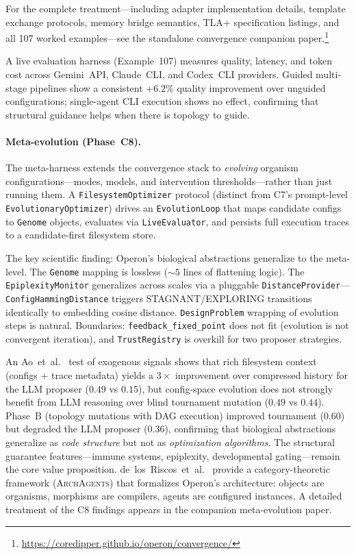 For the complete treatment---including adapter implementation details, template
exchange protocols, memory bridge semantics, TLA+ specification listings, and all
107 worked examples---see the standalone convergence companion
paper.\footnote{\url{https://coredipper.github.io/operon/convergence/}}

A live evaluation harness (Example~107) measures quality, latency, and token
cost across Gemini~API, Claude~CLI, and Codex~CLI providers. Guided
multi-stage pipelines show a consistent $+6.2\%$ quality improvement over
unguided configurations; single-agent CLI execution shows no effect,
confirming that structural guidance helps when there is topology to guide.

\paragraph{Meta-evolution (Phase~C8).}
The meta-harness extends the convergence stack to \emph{evolving} organism
configurations---modes, models, and intervention thresholds---rather than
just running them. A \texttt{FilesystemOptimizer} protocol (distinct from
C7's prompt-level \texttt{EvolutionaryOptimizer}) drives an
\texttt{EvolutionLoop} that maps candidate configs to \texttt{Genome}
objects, evaluates via \texttt{LiveEvaluator}, and persists full execution
traces to a candidate-first filesystem store.

The key scientific finding: Operon's biological abstractions generalize to
the meta-level. The \texttt{Genome} mapping is lossless (${\sim}5$ lines of
flattening logic). The \texttt{EpiplexityMonitor} generalizes across scales
via a pluggable \texttt{DistanceProvider}---\texttt{ConfigHammingDistance}
triggers STAGNANT/EXPLORING transitions identically to embedding cosine
distance. \texttt{DesignProblem} wrapping of evolution steps is natural.
Boundaries: \texttt{feedback\_fixed\_point} does not fit (evolution is not
convergent iteration), and \texttt{TrustRegistry} is overkill for two
proposer strategies.

An Ao~et~al.~\cite{ao2026delegation} test of exogenous signals shows that
rich filesystem context (configs $+$ trace metadata) yields a $3\times$
improvement over compressed history for the LLM proposer ($0.49$ vs
$0.15$), but config-space evolution does not strongly benefit from LLM
reasoning over blind tournament mutation ($0.49$ vs $0.44$). Phase~B
(topology mutations with DAG execution) improved tournament ($0.60$) but
degraded the LLM proposer ($0.36$), confirming that biological abstractions
generalize as \emph{code structure} but not as \emph{optimization
algorithms}. The structural guarantee features---immune systems, epiplexity,
developmental gating---remain the core value proposition.
de~los~Riscos~et~al.~\cite{delosriscos2026categorical} provide a
category-theoretic framework (\textsc{ArchAgents}) that formalizes
Operon's architecture: objects are organisms, morphisms are compilers,
agents are configured instances. A detailed treatment of the C8 findings
appears in the companion meta-evolution paper.
